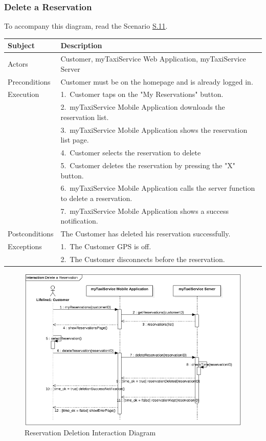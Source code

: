 \subsubsection{Delete a Reservation}
			To accompany this diagram, read the Scenario \hyperref[sec:ReservationDeletionScenario]{S.11}.

				\begin{table}[htpb]
					\centering
					\label{tab:ReservationDeletionTable}
					\begin{tabularx}{\textwidth}{lp{9cm}}
						\hline
						\hline
							\textbf{Subject}
						& 
							\textbf{Description}\\
						\hline
							Actors	       &  Customer, myTaxiService Web Application, myTaxiService Server\\
						\hline
							Preconditions  &  Customer must be on the homepage and is already logged in.\\
						\hline
							Execution      &  1.~Customer taps on the "My Reservations" button.\\
										   &  2.~myTaxiService Mobile Application downloads the reservation list.\\
										   &  3.~myTaxiService Mobile Application shows the reservation list page.\\
										   &  4.~Customer selects the reservation to delete\\
										   &  5.~Customer deletes the reservation by pressing the "X" button.\\
										   &  6.~myTaxiService Mobile Application calls the server function to delete a reservation.\\
										   &  7.~myTaxiService Mobile Application shows a success notification.\\
						\hline
							Postconditions &  The Customer has deleted his reservation successfully.\\
						\hline
							Exceptions     &  1.~The Customer GPS is off.\\
							               &  2.~The Customer disconnects before the reservation.\\
									
						\hline
						\hline
					\end{tabularx}
				\end{table}
				
				\begin{figure}[H]
					\centering
					\includegraphics[width=\textwidth, scale=0.5]{IMG/InteractionDiagrams/ReservationDeletion.png}
					\caption{Reservation Deletion Interaction Diagram}\label{sec:FigureReservationDeletion}
				\end{figure}